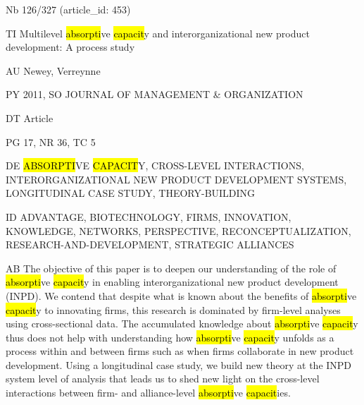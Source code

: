 \documentclass[a4paper]{article}
\begin{document}
\vspace*{-2cm}
Nb \tabto{0cm}126/327 (article\_id: 453)\par
TI \tabto{0cm}Multilevel \hl{absorpti}ve \hl{capacit}y and interorganizational new product development: A process study\par
AU \tabto{0cm}Newey, Verreynne\par
PY \tabto{0cm}2011, SO JOURNAL OF MANAGEMENT \& ORGANIZATION\par
DT \tabto{0cm}Article\par
PG \tabto{0cm}17, NR 36, TC 5\par
DE \tabto{0cm}\hl{ABSORPTI}VE \hl{CAPACIT}Y, CROSS-LEVEL INTERACTIONS, INTERORGANIZATIONAL NEW PRODUCT DEVELOPMENT SYSTEMS, LONGITUDINAL CASE STUDY, THEORY-BUILDING\par
ID \tabto{0cm}ADVANTAGE, BIOTECHNOLOGY, FIRMS, INNOVATION, KNOWLEDGE, NETWORKS, PERSPECTIVE, RECONCEPTUALIZATION, RESEARCH-AND-DEVELOPMENT, STRATEGIC ALLIANCES\par
AB \tabto{0cm}The objective of this paper is to deepen our understanding of the role of \hl{absorpti}ve \hl{capacit}y in enabling interorganizational new product development (INPD). We contend that despite what is known about the benefits of \hl{absorpti}ve \hl{capacit}y to innovating firms, this research is dominated by firm-level analyses using cross-sectional data. The accumulated knowledge about \hl{absorpti}ve \hl{capacit}y thus does not help with understanding how \hl{absorpti}ve \hl{capacit}y unfolds as a process within and between firms such as when firms collaborate in new product development. Using a longitudinal case study, we build new theory at the INPD system level of analysis that leads us to shed new light on the cross-level interactions between firm- and alliance-level \hl{absorpti}ve \hl{capacit}ies.\par
\clearpage
\end{document}
